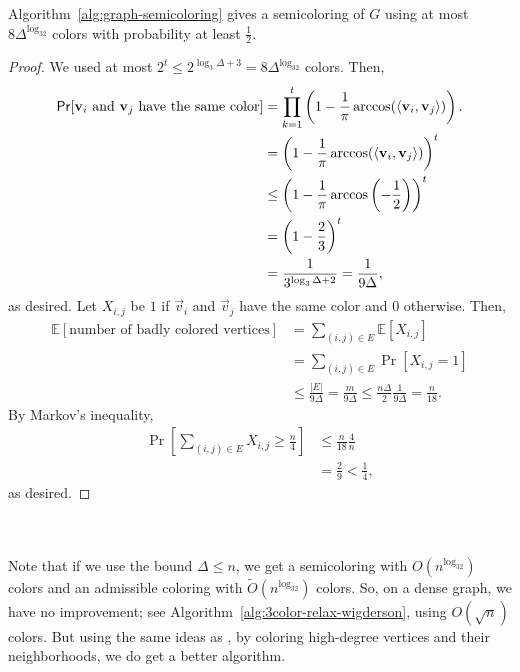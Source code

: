         \begin{lemma*}
            Algorithm~\ref{alg:graph-semicoloring} gives a semicoloring of \(G\) using at most \(8\Delta^{\log_32}\) colors with probability at least \(\frac{1}{2}\).
            \begin{proof}
                We used at most \(2^t\leq 2^{\log_3\Delta+3}=8\Delta^{\log_32}\) colors. Then,
                \begin{align*}
                    \mathsf{Pr}[\mathbf{v}_i\text{ and }\mathbf{v}_j\text{ have the same color}]&=\prod_{k=1}^t \left(1-\frac{1}{\pi}\arccos(\left\langle \mathbf{v}_i,\mathbf{v}_j\right\rangle)\right). \\
                    &=\left(1-\frac{1}{\pi}\arccos(\left\langle \mathbf{v}_i,\mathbf{v}_j\right\rangle)\right)^t \\
                    &\leq \left(1-\frac{1}{\pi}\arccos\left(-\frac{1}{2}\right)\right)^t \\
                    &=\left(1-\frac{2}{3}\right)^t \\
                    &=\frac{1}{3^{\log_3\Delta+2}}=\frac{1}{9\Delta},
                \end{align*}
                as desired. Let \(X_{i,j}\) be \(1\) if \(\vec{v}_i\) and \(\vec{v}_j\) have the same color and \(0\) otherwise. Then,
                \begin{align*}
                    \mathbb{E}[\text{number of badly colored vertices}]&=\sum_{(i,j)\in E}\mathbb{E}[X_{i,j}] \\
                    &=\sum_{(i,j)\in E} \Pr[X_{i,j}=1] \\
                    &\leq \frac{|E|}{9\Delta}=\frac{m}{9\Delta}\leq \frac{n\Delta}{2}\frac{1}{9\Delta}=\frac{n}{18}.
                \end{align*}
                By Markov's inequality,
                \begin{align*}
                    \Pr\left[\sum_{(i,j)\in E} X_{i,j}\geq\frac{n}{4}\right]&\leq \frac{n}{18}\frac{4}{n} \\
                    &=\frac{2}{9}<\frac{1}{4},
                \end{align*}
                as desired.
            \end{proof}
        \end{lemma*}
        \vphantom
        \\
        \\
        Note that if we use the bound \(\Delta\leq n\), we get a semicoloring with \(O\left(n^{\log_32}\right)\) colors and an admissible coloring with \(\tilde{O}\left(n^{\log_32}\right)\) colors. So, on a dense graph, we have no improvement; see Algorithm~\ref{alg:3color-relax-wigderson}, using \(O(\sqrt{n})\) colors. But using the same ideas as \cite{wigderson1983improving}, by coloring high-degree vertices and their neighborhoods, we do get a better algorithm. 
